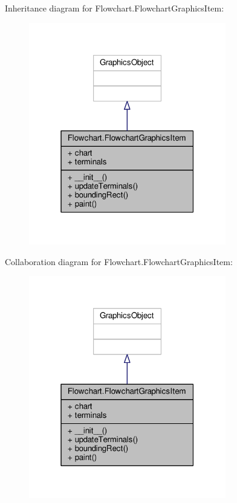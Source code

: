 Inheritance diagram for Flowchart.\+Flowchart\+Graphics\+Item\+:\nopagebreak
\begin{figure}[H]
\begin{center}
\leavevmode
\includegraphics[width=244pt]{d3/d17/classFlowchart_1_1FlowchartGraphicsItem__inherit__graph}
\end{center}
\end{figure}


Collaboration diagram for Flowchart.\+Flowchart\+Graphics\+Item\+:\nopagebreak
\begin{figure}[H]
\begin{center}
\leavevmode
\includegraphics[width=244pt]{dc/d90/classFlowchart_1_1FlowchartGraphicsItem__coll__graph}
\end{center}
\end{figure}


